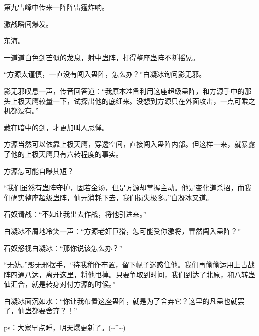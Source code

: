 \begin{this_body}
第九雪峰中传来一阵阵雷霆炸响。

激战瞬间爆发。

东海。

一道道白色剑芒似的龙息，射中蛊阵，打得整座蛊阵不断摇晃。

“方源太谨慎，一直没有闯入蛊阵，怎么办？”白凝冰询问影无邪。

影无邪叹息一声，传音回答道：“我原本准备利用这座超级蛊阵，和方源手中的那头上极天鹰较量一下，试探出他的底细来。没想到方源只在外面攻击，一点可乘之机都没有。”

藏在暗中的剑，才更加叫人忌惮。

方源当然可以依靠上极天鹰，穿透空间，直接闯入蛊阵内部。但这样一来，就暴露了他的上极天鹰只有六转程度的事实。

方源怎可能自曝其短？

“我们虽然有蛊阵守护，固若金汤，但是方源却掌握主动。他是变化道杀招，而我们确实整座超级蛊阵，仙元消耗下去，我们损失极多。”白凝冰又道。

石奴请战：“不如让我出去作战，将他引进来。”

白凝冰不屑地冷笑一声：“方源老奸巨猾，怎可能受你激将，冒然闯入蛊阵？”

石奴怒视白凝冰：“那你说该怎么办？”

“无妨。”影无邪摆手，“待我稍作布置，留下幌子迷惑住他。我们再偷偷运用上古战阵四通八达，离开这里，将他甩掉。只要争取到时间，我们到达了北原，和八转蛊仙汇合，就是转身对付方源的时候。”

白凝冰面沉如水：“你让我布置这座蛊阵，就是为了舍弃它？这里的凡蛊也就罢了，仙蛊都要舍弃？！”

ps：大家早点睡，明天爆更新了。(\~{}\^{}\~{})

\end{this_body}

